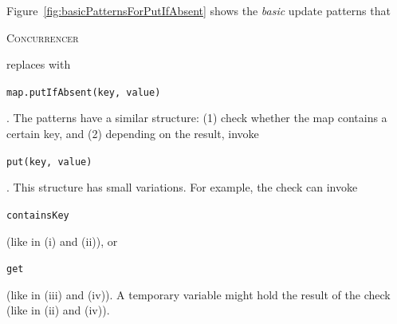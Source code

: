 \documentclass[10pt,twocolumn]{article}
\newcommand{\tool}{\begin{scriptsize}\textsc{Concurrencer}\end{scriptsize}\xspace}
\newenvironment{CodeOut}{\begin{scriptsize}}{\end{scriptsize}}
\newcommand{\code}[1]{\begin{smaller}\texttt{#1}\end{smaller}}
\newcommand{\MaxWidth}{\columnwidth}
\begin{document}
% 
% 
% 
% 
% 
Figure~\ref{fig:basicPatternsForPutIfAbsent} shows the \emph{basic} update
patterns that \tool replaces with \code{map.putIfAbsent(key, value)}. The
patterns have a similar structure: (1) check whether the map contains a certain
key, and (2) depending on the result, invoke \code{put(key, value)}. This
structure has small variations. For example, the check can invoke
\code{containsKey} (like in (i) and (ii)), or \code{get} (like in (iii) and
(iv)). A temporary variable might hold the result of the check (like in (ii)
and (iv)). 
\end{document}
